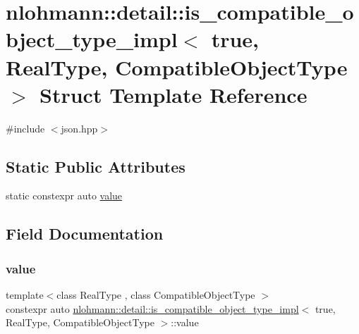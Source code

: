 \hypertarget{structnlohmann_1_1detail_1_1is__compatible__object__type__impl_3_01true_00_01_real_type_00_01_compatible_object_type_01_4}{}\section{nlohmann\+::detail\+::is\+\_\+compatible\+\_\+object\+\_\+type\+\_\+impl$<$ true, Real\+Type, Compatible\+Object\+Type $>$ Struct Template Reference}
\label{structnlohmann_1_1detail_1_1is__compatible__object__type__impl_3_01true_00_01_real_type_00_01_compatible_object_type_01_4}


{\ttfamily \#include $<$json.\+hpp$>$}

\subsection*{Static Public Attributes}
\begin{DoxyCompactItemize}
\item 
static constexpr auto \mbox{\hyperlink{structnlohmann_1_1detail_1_1is__compatible__object__type__impl_3_01true_00_01_real_type_00_01_compatible_object_type_01_4_afa131fcd3a4fc1881dd350a04589e6cf}{value}}
\end{DoxyCompactItemize}


\subsection{Field Documentation}
\mbox{\label{structnlohmann_1_1detail_1_1is__compatible__object__type__impl_3_01true_00_01_real_type_00_01_compatible_object_type_01_4_afa131fcd3a4fc1881dd350a04589e6cf}} 
\subsubsection{\texorpdfstring{value}{value}}
{\footnotesize\ttfamily template$<$class Real\+Type , class Compatible\+Object\+Type $>$ \\
constexpr auto \mbox{\hyperlink{structnlohmann_1_1detail_1_1is__compatible__object__type__impl}{nlohmann\+::detail\+::is\+\_\+compatible\+\_\+object\+\_\+type\+\_\+impl}}$<$ true, Real\+Type, Compatible\+Object\+Type $>$\+::value\hspace{0.3cm}{\ttfamily [static]}}

